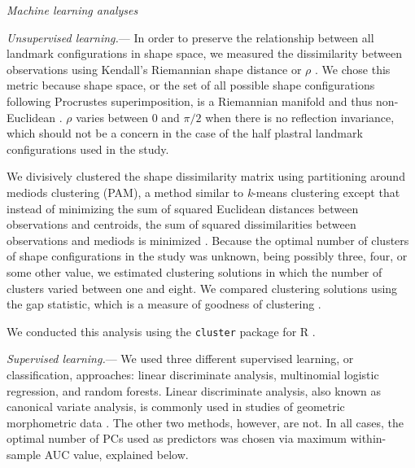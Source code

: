 \documentclass[12pt,letterpaper]{article}
\renewcommand{\subsection}[1]{%
\bigskip
\begin{center}
\begin{large}
\normalfont\itshape #1
\end{large}
\end{center}}
\renewcommand{\subsubsection}[1]{%
\vspace{2ex}
\noindent
\textit{#1.}---}
\begin{document}
\subsection{Machine learning analyses}
\subsubsection{Unsupervised learning}
In order to preserve the relationship between all landmark configurations in shape space, we measured the dissimilarity between observations using Kendall's Riemannian shape distance or \(\rho\) \citep{Kendall1984a,Dryden1998a}. We chose this metric because shape space, or the set of all possible shape configurations following Procrustes superimposition, is a Riemannian manifold and thus non-Euclidean \citep{Dryden1998a}. \(\rho\) varies between 0 and \(\pi / 2\) when there is no reflection invariance, which should not be a concern in the case of the half plastral landmark configurations used in the study.

We divisively clustered the shape dissimilarity matrix using partitioning around mediods clustering (PAM), a method similar to \textit{k}-means clustering except that instead of minimizing the sum of squared Euclidean distances between observations and centroids, the sum of squared dissimilarities between observations and mediods is minimized \citep{Kaufman1990}. Because the optimal number of clusters of shape configurations in the study was unknown, being possibly three, four, or some other value, we estimated clustering solutions in which the number of clusters varied between one and eight. We compared clustering solutions using the gap statistic, which is a measure of goodness of clustering \citep{Tibshirani2001a}.


We conducted this analysis using the \texttt{cluster} package for R \citep{Maechler2013}.

\subsubsection{Supervised learning}
We used three different supervised learning, or classification, approaches: linear discriminate analysis, multinomial logistic regression, and random forests. Linear discriminate analysis, also known as canonical variate analysis, is commonly used in studies of geometric morphometric data \citep{Zelditch2004,Mitteroecker2011}. The other two methods, however, are not. In all cases, the optimal number of PCs used as predictors was chosen via maximum within-sample AUC value, explained below.
\end{document}
